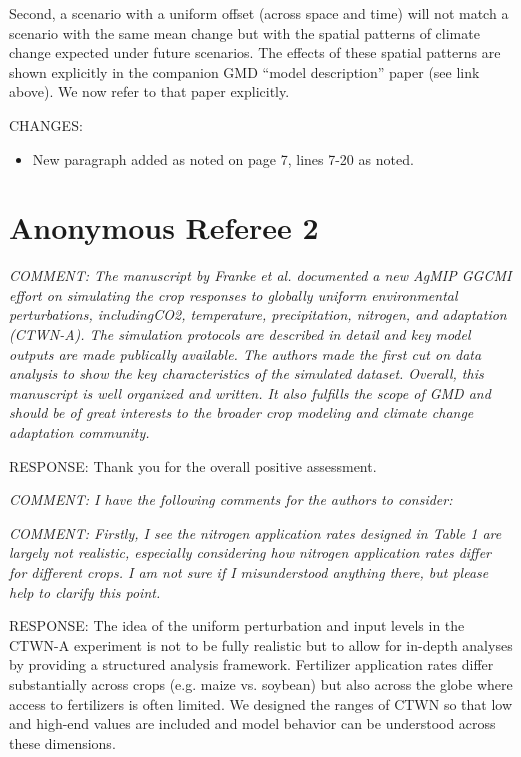 \documentclass[gmd, manuscript]{copernicus} %
\begin{document}
Second, a scenario with a uniform offset (across space and time) will not match a scenario with the same mean change but with the spatial patterns of climate change expected under future scenarios. The effects of these spatial patterns are shown explicitly in the companion GMD “model description” paper (see link above). We now refer to that paper explicitly. 

CHANGES:
\begin{itemize}
    \item New paragraph added as noted on page 7, lines 7-20 as noted.
\end{itemize}

\clearpage
\section{Anonymous Referee 2}

\textcolor{dark-gray}{\textit{COMMENT: The manuscript by Franke et al. documented a new AgMIP GGCMI effort on simulating the crop responses to globally uniform environmental perturbations, includingCO2, temperature, precipitation, nitrogen, and adaptation (CTWN-A). The simulation protocols are described in detail and key model outputs are made publically available. The authors made the first cut on data analysis to show the key characteristics of the simulated dataset. Overall, this manuscript is well organized and written. It also fulfills the scope of GMD and should be of great interests to the broader crop modeling and climate change adaptation community.}} 

RESPONSE: Thank you for the overall positive assessment.
\smallskip

\textcolor{dark-gray}{\textit{COMMENT: I have the following comments for the authors to consider:}} 

\textcolor{dark-gray}{\textit{COMMENT: Firstly, I see the nitrogen application rates designed in Table 1 are largely not realistic, especially considering how nitrogen application rates differ for different crops. I am not sure if I misunderstood anything there, but please help to clarify this point.}} 

RESPONSE: The idea of the uniform perturbation and input levels in the CTWN-A experiment is not to be fully realistic but to allow for in-depth analyses by providing a structured analysis framework. Fertilizer application rates differ substantially across crops (e.g. maize vs. soybean) but also across the globe where access to fertilizers is often limited. We designed the ranges of CTWN so that low and high-end values are included and model behavior can be understood across these dimensions.
\end{document}
